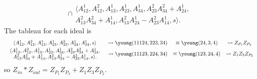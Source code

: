 \documentclass[draft]{article}
\begin{document}
\begin{example}
\[\cap \begin{array}{c}
     \langle A_{12}^1, A_{12}^2, A_{13}^1, A_{23}^1, A_{34}^1, A_{23}^2A_{34}^2 + A_{24}^1,  \\
     A_{13}^2A_{34}^2 + A_{14}^1, A_{13}^2A_{24}^1 - A_{23}^2A_{14}^1, s \rangle. 
\end{array} 
\]
The tableau for each ideal is
\[\begin{array}{cccc}\vspace{1mm}
    \langle A_{12}^1, A_{12}^2, A_{13}^1, A_{23}^1, A_{23}^2, A_{24}^1, A_{34}^1,s \rangle &\leadsto \young(11124,223,34) &\equiv \young(24,3,4) &\leadsto Z_{P_1} Z_{P_3} \\ 
    \begin{array}{c}
     \langle A_{12}^1, A_{12}^2, A_{13}^1, A_{23}^1, A_{34}^1, A_{23}^2A_{34}^2 + A_{24}^1,  \\
     A_{13}^2A_{34}^2 + A_{14}^1, A_{13}^2A_{24}^1 - A_{23}^2A_{14}^1, s \rangle. 
\end{array} &\leadsto \young(11123,224,34) &\equiv \young(123,24,4) &\leadsto Z_1 Z_3 Z_{P_2}
\end{array}
\]
so $Z_{in} * Z_{out} = Z_{P_1} Z_{P_3} + Z_1 Z_3 Z_{P_2}$.
\end{example}



\end{document}
